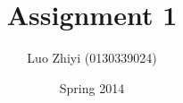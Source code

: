\documentclass[12pt,a4paper]{article}
\begin{document}
\begin{CJK*}{UTF8}{kai}

\title{
\huge Assignment 1 \\ %
}
\author{Luo Zhiyi (0130339024)}
\date{Spring 2014}
\maketitle

%
%
%
%
%
%
%
%
%
%

\end{CJK*}
\end{document}
